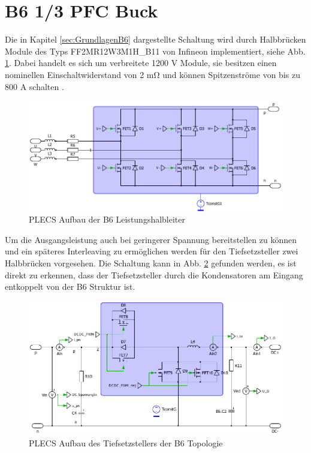 \section{B6 1/3 PFC Buck}
Die in Kapitel \ref{sec:GrundlagenB6} dargestellte Schaltung wird durch Halbbrücken Module des Typs FF2MR12W3M1H\_B11 von Infineon implementiert, siehe Abb. \ref{fig:plecsb6}. Dabei handelt es sich um verbreitete 1200 \si{\volt} Module, sie besitzen einen nominellen Einschaltwiderstand von 2 \si{\milli \ohm} und können Spitzenströme von bis zu 800 \si{\ampere} schalten \cite{IFAGFF2}.
\begin{figure}[H]
	\centering
	\includegraphics[width=0.9\linewidth]{content/Grafiken/PLECS_B6}
	\caption{PLECS Aufbau der B6 Leistungshalbleiter}
	\label{fig:plecsb6}
\end{figure}
 Um die Ausgangsleistung auch bei geringerer Spannung bereitstellen zu können und ein späteres Interleaving zu ermöglichen werden für den Tiefsetzsteller zwei Halbbrücken vorgesehen. Die Schaltung kann in Abb. \ref{fig:plecsb6buck} gefunden werden, es ist direkt zu erkennen, dass der Tiefsetzsteller durch die Kondensatoren am Eingang entkoppelt von der B6 Struktur ist.
 \begin{figure}[H]
 	\centering
 	\includegraphics[width=0.9\linewidth]{content/Grafiken/PLECS_B6Buck}
 	\caption{PLECS Aufbau des Tiefsetzstellers der B6 Topologie}
 	\label{fig:plecsb6buck}
 \end{figure}
 

